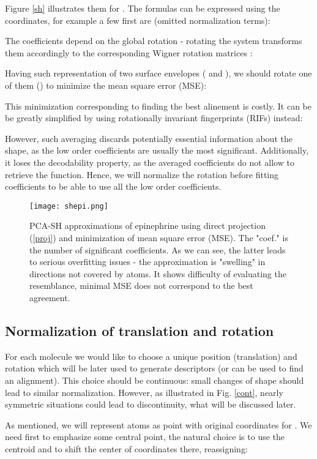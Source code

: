 \documentclass[10pt,journal]{IEEEtranTCOM}
\theoremstyle{plain}
\begin{document}
Figure \ref{sh} illustrates them for . The formulas can be expressed using the  coordinates, for example a few first are (omitted normalization terms):




The  coefficients depend on the global rotation - rotating the system transforms them accordingly to the corresponding Wigner rotation matrices :


Having such representation of two surface envelopes ( and ), we should rotate one of them () to minimize the mean square error (MSE):

This minimization corresponding to finding the best alinement is costly. It can be be greatly simplified by using rotationally invariant fingerprints (RIFs) instead:

However, such averaging discards potentially essential information about the shape, as the low order coefficients are usually the most significant. Additionally, it loses the decodability property, as the averaged coefficients do not allow to retrieve the  function. Hence, we will normalize the rotation before fitting coefficients to be able to use all the low order coefficients.
\begin{figure*}[t!]
    \centering
        \texttt{[image: shepi.png]}
        \caption{PCA-SH approximations of epinephrine using direct projection (\ref{proj}) and minimization of mean square error (MSE). The "coef." is the number of significant coefficients. As we can see, the latter leads to serious overfitting issues - the approximation is "swelling" in directions not covered by atoms. It shows difficulty of evaluating the resemblance, minimal MSE does not correspond to the best agreement. }
        \label{shepi}
\end{figure*}
\subsection{Normalization of translation and rotation} \label{normal}
For each molecule we would like to choose a unique position (translation) and rotation which will be later used to generate descriptors (or can be used to find an alignment).
This choice should be continuous: small changes of shape should lead to similar normalization. However, as illustrated in Fig. \ref{cont}, nearly symmetric situations could lead to discontinuity, what will be discussed later.


As mentioned, we will represent  atoms as point with original coordinates  for . We need first to emphasize some central point, the natural choice is to use the centroid and to shift the center of coordinates there, reassigning:
\end{document}
